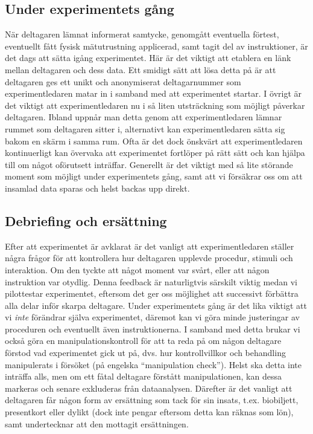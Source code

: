 \documentclass[
]{book}
\begin{document}
\hypertarget{sub07.6.6}{%
\subsection{Under experimentets gång}\label{sub07.6.6}}

När deltagaren lämnat informerat samtycke, genomgått eventuella förtest, eventuellt fått fysisk mätutrustning applicerad, samt tagit del av instruktioner, är det dags att sätta igång experimentet. Här är det viktigt att etablera en länk mellan deltagaren och dess data. Ett smidigt sätt att lösa detta på är att deltagaren ges ett unikt och anonymiserat deltagarnummer som experimentledaren matar in i samband med att experimentet startar. I övrigt är det viktigt att experimentledaren nu i så liten utsträckning som möjligt påverkar deltagaren. Ibland uppnår man detta genom att experimentledaren lämnar rummet som deltagaren sitter i, alternativt kan experimentledaren sätta sig bakom en skärm i samma rum. Ofta är det dock önskvärt att experimentledaren kontinuerligt kan övervaka att experimentet fortlöper på rätt sätt och kan hjälpa till om något oförutsett inträffar. Generellt är det viktigt med så lite störande moment som möjligt under experimentets gång, samt att vi försäkrar oss om att insamlad data sparas och helst backas upp direkt.

\hypertarget{sub07.6.7}{%
\subsection{Debriefing och ersättning}\label{sub07.6.7}}

Efter att experimentet är avklarat är det vanligt att experimentledaren ställer några frågor för att kontrollera hur deltagaren upplevde procedur, stimuli och interaktion. Om den tyckte att något moment var svårt, eller att någon instruktion var otydlig. Denna feedback är naturligtvis särskilt viktig medan vi pilottestar experimentet, eftersom det ger oss möjlighet att successivt förbättra alla delar inför skarpa deltagare. Under experimentets gång är det lika viktigt att vi \emph{inte} förändrar själva experimentet, däremot kan vi göra minde justeringar av proceduren och eventuellt även instruktionerna. I samband med detta brukar vi också göra en manipulationskontroll för att ta reda på om någon deltagare förstod vad experimentet gick ut på, dvs. hur kontrollvillkor och behandling manipulerats i försöket (på engelska ``manipulation check''). Helst ska detta inte inträffa alls, men om ett fåtal deltagare förstått manipulationen, kan dessa markeras och senare exkluderas från dataanalysen. Därefter är det vanligt att deltagaren får någon form av ersättning som tack för sin insats, t.ex. biobiljett, presentkort eller dylikt (dock inte pengar eftersom detta kan räknas som lön), samt undertecknar att den mottagit ersättningen.
\end{document}
